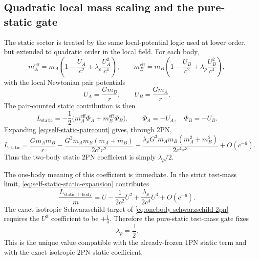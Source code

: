 \documentclass[11pt]{article}
\newcommand{\OnePN}{\mathrm{1PN}}
\newcommand{\TwoPN}{\mathrm{2PN}}
\begin{document}
\subsection{Quadratic local mass scaling and the pure-static gate}
\label{sec:self-static-static}

The static sector is treated by the same local-potential logic used at lower order, but
extended to quadratic order in the local field.  For each body,
\begin{equation}
m_A^{\mathrm{eff}}=m_A\left(1-\frac{U_A}{c^2}+\lambda_\rho\frac{U_A^2}{c^4}\right),
\qquad
m_B^{\mathrm{eff}}=m_B\left(1-\frac{U_B}{c^2}+\lambda_\rho\frac{U_B^2}{c^4}\right),
\label{eq:self-static-meff}
\end{equation}
with the local Newtonian pair potentials
\begin{equation}
U_A=\frac{Gm_B}{r},
\qquad
U_B=\frac{Gm_A}{r}.
\label{eq:self-static-UAUB}
\end{equation}
The pair-counted static contribution is then
\begin{equation}
L_{\mathrm{static}}
=-\frac12\bigl(m_A^{\mathrm{eff}}\Phi_A+m_B^{\mathrm{eff}}\Phi_B\bigr),
\qquad
\Phi_A=-U_A,
\quad
\Phi_B=-U_B.
\label{eq:self-static-paircount}
\end{equation}
Expanding \cref{eq:self-static-paircount} gives, through \(\TwoPN\),
\begin{equation}
L_{\mathrm{static}}
=\frac{Gm_A m_B}{r}
-\frac{G^2m_A m_B(m_A+m_B)}{2c^2r^2}
+\frac{\lambda_\rho G^3m_A m_B(m_A^2+m_B^2)}{2c^4r^3}
+O(c^{-6}).
\label{eq:self-static-static-expansion}
\end{equation}
Thus the two-body static \(\TwoPN\) coefficient is simply \(\lambda_\rho/2\).

The one-body meaning of this coefficient is immediate.  In the strict test-mass limit,
\cref{eq:self-static-static-expansion} contributes
\begin{equation}
\frac{L_{\mathrm{static},1\text{-}\mathrm{body}}}{m}
=U-\frac{1}{2c^2}U^2+\frac{\lambda_\rho}{2c^4}U^3+O(c^{-6}).
\label{eq:self-static-onebody-static}
\end{equation}
The exact isotropic Schwarzschild target of
\cref{eq:onebody-schwarzschild-2pn} requires the \(U^3\) coefficient to be \(+\frac14\).
Therefore the pure-static test-mass gate fixes
\begin{equation}
\lambda_\rho=\frac12.
\label{eq:self-static-lambda-rho}
\end{equation}
This is the unique value compatible with the already-frozen \(\OnePN\) static term and
with the exact isotropic \(\TwoPN\) static coefficient.
\end{document}
